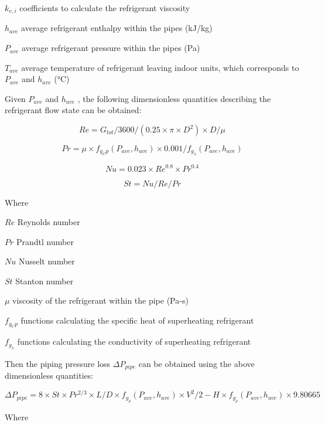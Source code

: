 \(k_{v,i}\) coefficients to calculate the refrigerant viscosity

\(h_{ave}\) average refrigerant enthalpy within the pipes (kJ/kg)

\(P_{ave}\) average refrigerant pressure within the pipes (Pa)

\(T_{ave}\) average temperature of refrigerant leaving indoor units, which corresponds to \(P_{ave}\) and \(h_{ave}\) (°C)

Given \(P_{ave}\) and \(h_{ave}\) , the following dimensionless quantities describing the refrigerant flow state can be obtained:

\begin{equation}
Re = G_{tot}/3600/(0.25\times\pi\times{D^2})\times{D}/\mu
\end{equation}

\begin{equation}
Pr = \mu\times{f_{g_Cp}(P_{ave},h_{ave})}\times{0.001}/f_{g_\lambda}(P_{ave},h_{ave})
\end{equation}

\begin{equation}
Nu = 0.023\times{Re^{0.8}\times{Pr^{0.4}}}
\end{equation}

\begin{equation}
St = Nu/Re/Pr
\end{equation}

Where

\(Re\) Reynolds number

\(Pr\) Prandtl number

\(Nu\) Nusselt number

\(St\) Stanton number

\(\mu\) viscosity of the refrigerant within the pipe (Pa-s)

\(f_{g_Cp}\) functions calculating the specific heat of superheating refrigerant

\(f_{g_\lambda}\) functions calculating the conductivity of superheating refrigerant

Then the piping pressure loss \(\Delta{P_{pipe}}\) can be obtained using the above dimensionless quantities:

\begin{equation}
\Delta{P_{pipe}} = 8\times{St}\times{Pr^{2/3}}\times{L/D}\times{f_{g_\rho}(P_{ave},h_{ave})}\times{V^2}/2-H\times{f_{g_\rho}(P_{ave},h_{ave})}\times9.80665
\end{equation}

Where

